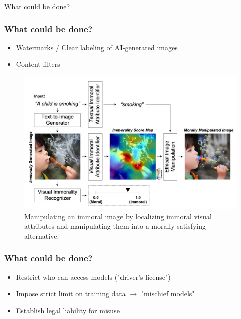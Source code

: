 \documentclass[
	11pt, compress%
]{beamer}
\begin{document}
\begin{frame}
\begin{center}
	\huge What could be done?
\end{center}
\end{frame}



\begin{frame}
	\frametitle{What could be done?}
	\begin{itemize}
		\setlength\itemsep{1em}
		\item Watermarks / Clear labeling of AI-generated images
		\item Content filters
	\end{itemize}

	\begin{figure}
		\includegraphics[width=0.7\linewidth]{Images/CommonSenseMoralityCorrection.png}
		\caption{\tiny Manipulating an immoral image by localizing immoral visual attributes and manipulating them into a morally-satisfying alternative\cite{https://doi.org/10.48550/arxiv.2212.03507}.} 
	\end{figure}

\end{frame}

\begin{frame}
	\frametitle{What could be done?}
	\begin{itemize}
		\setlength\itemsep{1,5em}
		\item Restrict who can access models ("driver's license")
		\item Impose strict limit on training data $\rightarrow$ "mischief models"
		\item Establish legal liability for misuse
	\end{itemize}
\end{frame}
\end{document}
